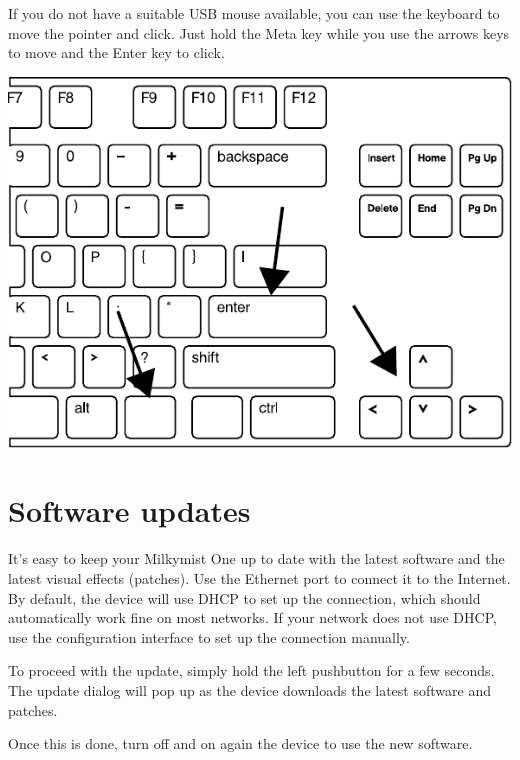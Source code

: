 \documentclass{leaflet}
\begin{document}
If you do not have a suitable USB mouse available, you can use the keyboard to move the pointer and click. Just hold the Meta key while you use the arrows keys to move and the Enter key to click.

\includegraphics[width=\textwidth]{keyboard.pdf}

\section{Software updates}
It's easy to keep your Milkymist One up to date with the latest software and the latest visual effects (patches). Use the Ethernet port to connect it to the Internet. By default, the device will use DHCP to set up the connection, which should automatically work fine on most networks. If your network does not use DHCP, use the configuration interface to set up the connection manually.

To proceed with the update, simply hold the left pushbutton for a few seconds. The update dialog will pop up as the device downloads the latest software and patches.

Once this is done, turn off and on again the device to use the new software.
\end{document}
